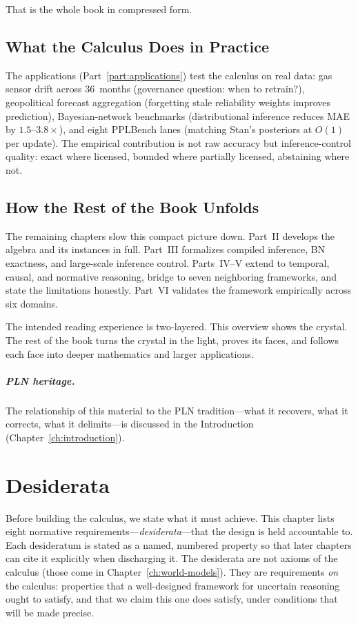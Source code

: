 \documentclass[11pt,openany]{report}
\begin{document}
That is the whole book in compressed form.

\section{What the Calculus Does in Practice}

The applications (Part~\ref{part:applications}) test the
calculus on real data: gas sensor drift across 36~months
(governance question: when to retrain?), geopolitical forecast
aggregation (forgetting stale reliability weights improves
prediction), Bayesian-network benchmarks (distributional inference
reduces MAE by $1.5$--$3.8\times$), and eight PPLBench lanes
(matching Stan's posteriors at $O(1)$ per update).  The empirical
contribution is not raw accuracy but inference-control quality:
exact where licensed, bounded where partially licensed, abstaining
where not.

\section{How the Rest of the Book Unfolds}
\label{sec:overview-rest}

The remaining chapters slow this compact picture down.
Part~II develops the algebra and its instances in full.
Part~III formalizes compiled inference, BN exactness, and
large-scale inference control.
Parts~IV--V extend to temporal, causal, and normative reasoning,
bridge to seven neighboring frameworks, and state the limitations
honestly.
Part~VI validates the framework empirically across six domains.

The intended reading experience is two-layered.  This overview
shows the crystal.  The rest of the book turns the crystal in the
light, proves its faces, and follows each face into deeper
mathematics and larger applications.

\paragraph{PLN heritage.}
The relationship of this material to the PLN
tradition---what it recovers, what it corrects, what it
delimits---is discussed in the Introduction
(Chapter~\ref{ch:introduction}).


\chapter{Desiderata}
\label{ch:desiderata}

Before building the calculus, we state what it must achieve.  This
chapter lists eight normative requirements---\emph{desiderata}---that
the design is held accountable to.  Each desideratum is stated as a
named, numbered property so that later chapters can cite it explicitly
when discharging it.  The desiderata are not axioms of the calculus
(those come in Chapter~\ref{ch:world-models}).  They are requirements
\emph{on} the calculus: properties that a well-designed framework for
uncertain reasoning ought to satisfy, and that we claim this one does
satisfy, under conditions that will be made precise.
\end{document}
